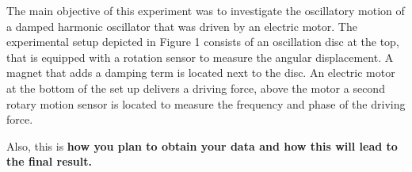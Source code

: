The main objective of this experiment was to investigate the oscillatory motion of a damped harmonic oscillator that was driven by an electric motor. The experimental setup depicted in Figure 1 consists of an oscillation disc at the top, that is equipped with a rotation sensor to measure the angular displacement. A magnet that adds a damping term is located next to the disc. An electric motor at the bottom of the set up delivers a driving force, above the motor a second rotary motion sensor is located to measure the frequency and phase of the driving force.

Also, this is \textbf{how you plan to obtain your data and how this will lead to the final result.} 
